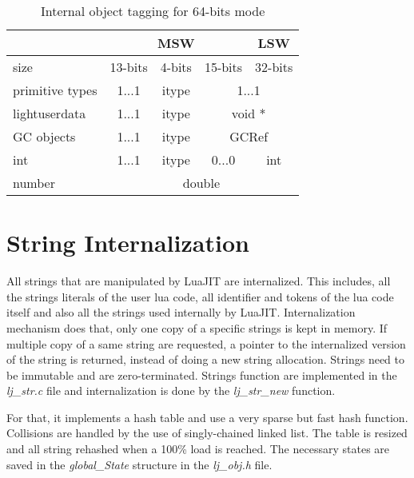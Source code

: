 \begin{table}[H]
\centering
\caption{Internal object tagging for 64-bits mode}
\label{tab:tagged-gc64}
\begin{tabular}{l|c|c|c|c|}
\cline{2-5}
                                      & \multicolumn{3}{c|}{MSW}         & LSW         \\ \hline
\multicolumn{1}{|l|}{size}            & 13-bits & 4-bits & 15-bits       & 32-bits     \\ \hline
\multicolumn{1}{|l|}{primitive types} & 1...1   & itype  & \multicolumn{2}{c|}{1...1}  \\
\multicolumn{1}{|l|}{lightuserdata}   & 1...1   & itype  & \multicolumn{2}{c|}{void *} \\
\multicolumn{1}{|l|}{GC objects}      & 1...1   & itype  & \multicolumn{2}{c|}{GCRef}  \\
\multicolumn{1}{|l|}{int}             & 1...1   & itype  & 0...0         & int         \\
\multicolumn{1}{|l|}{number}          & \multicolumn{4}{c|}{double}                    \\ \hline
\end{tabular}
\end{table}


\section{String Internalization}
\label{Sec:string-inter}

All strings that are manipulated by LuaJIT are internalized. This includes, all
the strings literals of the user lua code, all identifier and tokens of the lua
code itself and also all the strings used internally by LuaJIT. Internalization
mechanism does that, only one copy of a specific strings is kept in memory. If
multiple copy of a same string are requested, a pointer to the internalized
version of the string is returned, instead of doing a new string allocation.
Strings need to be immutable and are zero-terminated. Strings function are
implemented in the \emph{lj\_str.c} file and internalization is done by the
\emph{lj\_str\_new} function.

For that, it implements a hash table and use a very sparse but fast hash
function. Collisions are handled by the use of singly-chained linked list.
The table is resized and all string rehashed when a 100\% load is reached.
The necessary states are saved in the \emph{global\_State} structure in the
\emph{lj\_obj.h} file.

